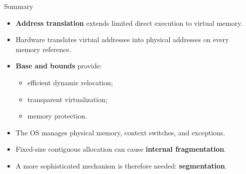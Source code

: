 \begin{frame}{Summary}
    \begin{itemize}
        \item \textbf{Address translation} extends limited direct
              execution to virtual memory.
        \item Hardware translates virtual addresses into
              physical addresses on every memory reference.
        \item \textbf{Base and bounds} provide:
        \begin{itemize}
            \item efficient dynamic relocation;
            \item transparent virtualization;
            \item memory protection.
        \end{itemize}
        \item The OS manages physical memory, context switches,
              and exceptions.
        \item Fixed-size contiguous allocation can cause
              \textbf{internal fragmentation}.
        \item A more sophisticated mechanism is therefore needed:
              \textbf{segmentation}.
    \end{itemize}
\end{frame}